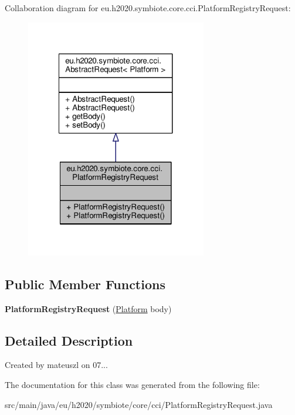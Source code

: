 Collaboration diagram for eu.\+h2020.\+symbiote.\+core.\+cci.\+Platform\+Registry\+Request\+:\nopagebreak
\begin{figure}[H]
\begin{center}
\leavevmode
\includegraphics[width=224pt]{classeu_1_1h2020_1_1symbiote_1_1core_1_1cci_1_1PlatformRegistryRequest__coll__graph}
\end{center}
\end{figure}
\subsection*{Public Member Functions}
\begin{DoxyCompactItemize}
\item 
\mbox{\label{classeu_1_1h2020_1_1symbiote_1_1core_1_1cci_1_1PlatformRegistryRequest_a439c9d6d6a12be6a47fb765c48e1a4ab}} 
{\bfseries Platform\+Registry\+Request} (\hyperlink{classeu_1_1h2020_1_1symbiote_1_1model_1_1mim_1_1Platform}{Platform} body)
\end{DoxyCompactItemize}


\subsection{Detailed Description}
Created by mateuszl on 07... 

The documentation for this class was generated from the following file\+:\begin{DoxyCompactItemize}
\item 
src/main/java/eu/h2020/symbiote/core/cci/Platform\+Registry\+Request.\+java\end{DoxyCompactItemize}
